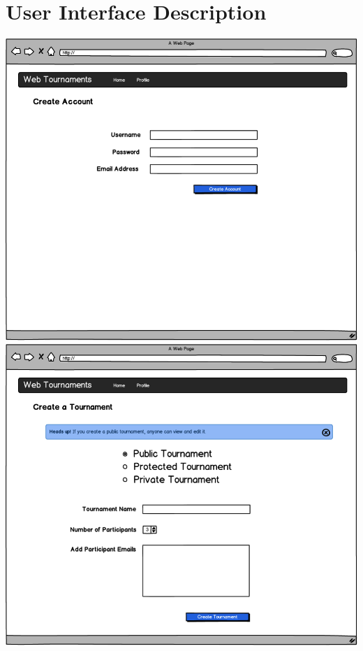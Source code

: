 \documentclass{article}
\begin{document}
\section{User Interface Description}
\includegraphics[width=1\textwidth]{one}
\newpage
\includegraphics[width=1\textwidth]{two}
\newpage
\end{document}
